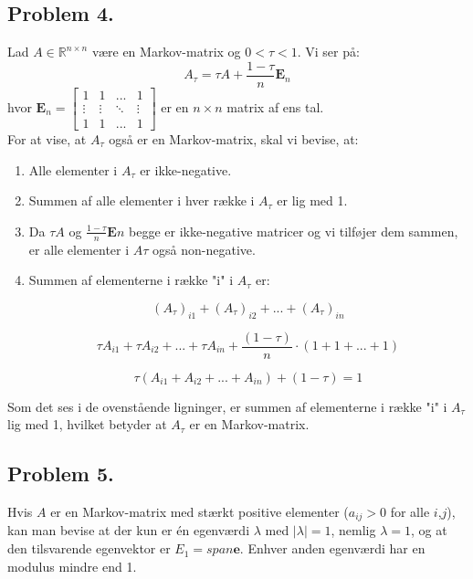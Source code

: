 \subsection*{Problem 4.}

Lad $A \in \mathbb{R}^{n \times n}$ være en Markov-matrix og $0 < \tau < 1$. Vi ser på: 
$$A_\tau = \tau A + \frac{1-\tau}{n} \mathbf{E}_n$$
hvor $\mathbf{E}_n = \begin{bmatrix} 1 & 1 & ... & 1\\ \vdots & \vdots & \ddots & \vdots\\ 1 & 1 & ... & 1 \end{bmatrix}$ er en $n \times n$ matrix af ens tal.\\

For at vise, at $A_\tau$ også er en Markov-matrix, skal vi bevise, at:
\begin{enumerate}
    \item Alle elementer i $A_\tau$ er ikke-negative.
    \item Summen af alle elementer i hver række i $A_\tau$ er lig med 1.
    \item Da $\tau A$ og $\frac{1-\tau}{n} \mathbf{E}n$ begge er ikke-negative matricer og vi tilføjer dem sammen, er alle elementer i $A\tau$ også non-negative.
    \item Summen af elementerne i række "i" i $A_\tau$ er:
    
    $$(A_\tau)_{i1} + (A_\tau)_{i2} + ... + (A_\tau)_{in}$$ 

$$\tau A_{i1} + \tau A_{i2} + ... + \tau A_{in} + \frac{(1 - \tau)}{n}\cdot (1+1+...+1)$$

$$\tau(A_{i1} + A_{i2} + ... + A_{in}) + (1 - \tau) = 1$$

\end{enumerate}


Som det ses i de ovenstående ligninger, er summen af elementerne i række "i" i $A_\tau$ lig med 1, hvilket betyder at $A_\tau$ er en Markov-matrix.

\subsection*{Problem 5.}

Hvis $A$ er en Markov-matrix med stærkt positive elementer ($a_{ij} > 0$ for alle $i$,$j$), kan man bevise at der kun er én egenværdi $\lambda$ med $|\lambda| = 1$, nemlig $\lambda = 1$, og at den tilsvarende egenvektor er $E_1 = span {\mathbf{e}}$. Enhver anden egenværdi har en modulus mindre end 1.

